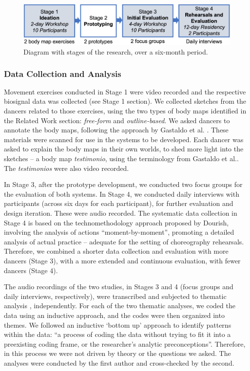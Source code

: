 \begin{figure}[ht]
  \centering
  \includegraphics[width=0.9\linewidth]{Chapters/Figures/modi_dis/multistage.jpg}
  \caption{Diagram with stages of the research, over a six-month period.}
    \label{fig:multistage}
\end{figure}

\subsubsection{Data Collection and Analysis}

Movement exercises conducted in Stage 1 were video recorded and the respective biosignal data was collected (see Stage 1 section). We collected sketches from the dancers related to those exercises, using the two types of body maps identified in the Related Work section: \textit{free-form} and \textit{outline-based}. We asked dancers to annotate the body maps, following the approach by Gastaldo et al. \cite{gastaldo_body-map_2012}. These materials were scanned for use in the systems to be developed. Each dancer was asked to explain the body maps in their own worlds, to shed more light into the sketches – a body map \textit{testimonio}, using the terminology from Gastaldo et al.. The \textit{testimonios} were also video recorded.

In Stage 3, after the prototype development, we conducted two focus groups for the evaluation of both systems. In Stage 4, we conducted daily interviews with participants (across six days for each participant), for further evaluation and design iteration. These were audio recorded. The systematic data collection in Stage 4 is based on the technomethodology approach proposed by Dourish, involving the analysis of actions “moment-by-moment”, promoting a detailed analysis of actual practice \cite{dourish_where_2001} – adequate for the setting of choreography rehearsals. Therefore, we combined a shorter data collection and evaluation with more dancers (Stage 3), with a more extended and continuous evaluation, with fewer dancers (Stage 4).

The audio recordings of the two studies, in Stages 3 and 4 (focus groups and daily interviews, respectively), were transcribed and subjected to thematic analysis \cite{braun_using_2006}, independently. For each of the two thematic analyses, we coded the data using an inductive approach, and the codes were then organized into themes. We followed an inductive ‘bottom up’ approach to identify patterns within the data: “a process of coding the data without trying to fit it into a preexisting coding frame, or the researcher’s analytic preconceptions”. Therefore, in this process we were not driven by theory or the questions we asked. The analyses were conducted by the first author and cross-checked by the second.

